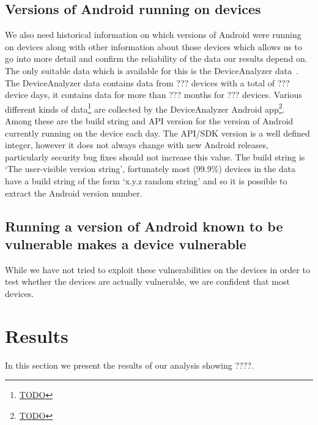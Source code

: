 \documentclass[conference,a4paper,twoside]{IEEEtran}
\begin{document}
\subsection{Versions of Android running on devices}
We also need historical information on which versions of Android were running on devices along with other information about those devices which allows us to go into more detail and confirm the reliability of the data our results depend on.
The only suitable data which is available for this is the DeviceAnalyzer data~\cite{TODO}.
The DeviceAnalyzer data contains data from ??? devices with a total of ??? device days, it contains data for more than ??? months for ??? devices.
Various different kinds of data\footnote{\url{TODO}} are collected by the DeviceAnalyzer Android app\footnote{\url{TODO}}.
Among these are the build string and API version for the version of Android currently running on the device each day.
The API/SDK version is a well defined integer, however it does not always change with new Android releases, particularly security bug fixes should not increase this value.
The build string is `The user-visible version string', fortunately most (99.9\%) devices in the data have a build string of the form `x.y.z random string' and so it is possible to extract the Android version number.

\subsection{Running a version of Android known to be vulnerable makes a device vulnerable}
While we have not tried to exploit these vulnerabilities on the devices in order to test whether the devices are actually vulnerable, we are confident that most devices.

\section{Results}
\label{sec:results}
In this section we present the results of our analysis showing ????. %
\end{document}
